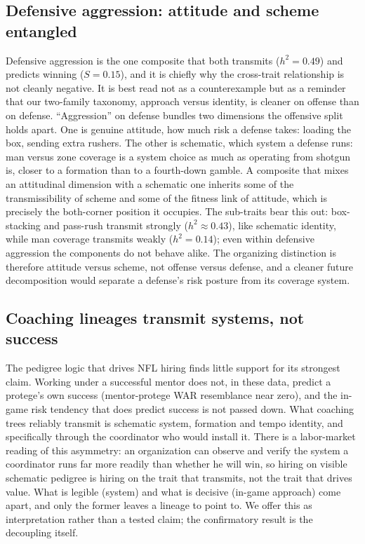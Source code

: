 \documentclass[11pt]{article}
\begin{document}
\subsection{Defensive aggression: attitude and scheme entangled}
Defensive aggression is the one composite that both transmits ($h^{2}=0.49$) and
predicts winning ($S=0.15$), and it is chiefly why the cross-trait relationship is
not cleanly negative. It is best read not as a counterexample but as a reminder that
our two-family taxonomy, approach versus identity, is cleaner on offense than on
defense. ``Aggression'' on defense bundles two dimensions the offensive split holds
apart. One is genuine attitude, how much risk a defense takes: loading the box,
sending extra rushers. The other is schematic, which system a defense runs: man
versus zone coverage is a system choice as much as operating from shotgun is,
closer to a formation than to a fourth-down gamble. A composite that mixes an
attitudinal dimension with a schematic one inherits some of the transmissibility of
scheme and some of the fitness link of attitude, which is precisely the both-corner
position it occupies. The sub-traits bear this out: box-stacking and pass-rush
transmit strongly ($h^{2}\approx0.43$), like schematic identity, while man coverage
transmits weakly ($h^{2}=0.14$); even within defensive aggression the components do
not behave alike. The organizing distinction is therefore attitude versus scheme,
not offense versus defense, and a cleaner future decomposition would separate a
defense's risk posture from its coverage system.

\subsection{Coaching lineages transmit systems, not success}
The pedigree logic that drives NFL hiring finds little support for its strongest
claim. Working under a successful mentor does not, in these data, predict a
protege's own success (mentor-protege WAR resemblance near zero), and the in-game
risk tendency that does predict success is not passed down. What coaching trees
reliably transmit is schematic system, formation and tempo identity, and
specifically through the coordinator who would install it. There is a labor-market
reading of this asymmetry: an organization can observe and verify the system a
coordinator runs far more readily than whether he will win, so hiring on visible
schematic pedigree is hiring on the trait that transmits, not the trait that drives
value. What is legible (system) and what is decisive (in-game approach) come apart,
and only the former leaves a lineage to point to. We offer this as interpretation
rather than a tested claim; the confirmatory result is the decoupling itself.
\end{document}
